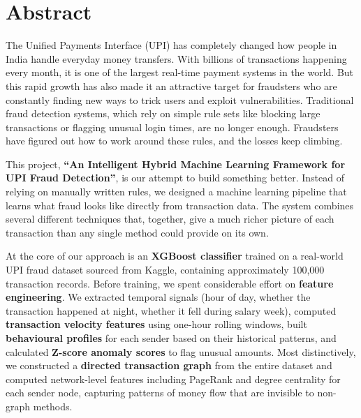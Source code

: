 \chapter*{Abstract}
\thispagestyle{plain}

The Unified Payments Interface (UPI) has completely changed how people in India handle everyday money transfers. With billions of transactions happening every month, it is one of the largest real-time payment systems in the world. But this rapid growth has also made it an attractive target for fraudsters who are constantly finding new ways to trick users and exploit vulnerabilities. Traditional fraud detection systems, which rely on simple rule sets like blocking large transactions or flagging unusual login times, are no longer enough. Fraudsters have figured out how to work around these rules, and the losses keep climbing.

\vspace{0.2in}

\noindent This project, \textbf{``An Intelligent Hybrid Machine Learning Framework for UPI Fraud Detection''}, is our attempt to build something better. Instead of relying on manually written rules, we designed a machine learning pipeline that learns what fraud looks like directly from transaction data. The system combines several different techniques that, together, give a much richer picture of each transaction than any single method could provide on its own.

\vspace{0.2in}

\noindent At the core of our approach is an \textbf{XGBoost classifier} trained on a real-world UPI fraud dataset sourced from Kaggle, containing approximately 100,000 transaction records. Before training, we spent considerable effort on \textbf{feature engineering}. We extracted temporal signals (hour of day, whether the transaction happened at night, whether it fell during salary week), computed \textbf{transaction velocity features} using one-hour rolling windows, built \textbf{behavioural profiles} for each sender based on their historical patterns, and calculated \textbf{Z-score anomaly scores} to flag unusual amounts. Most distinctively, we constructed a \textbf{directed transaction graph} from the entire dataset and computed network-level features including PageRank and degree centrality for each sender node, capturing patterns of money flow that are invisible to non-graph methods.

\vspace{0.2in}

